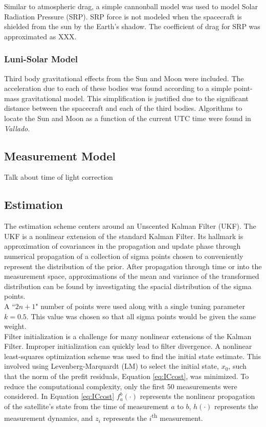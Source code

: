 \documentclass[11pt]{article}
\begin{document}
Similar to atmospheric drag, a simple cannonball model was used to model Solar Radiation Pressure (SRP). SRP force is not modeled when the spacecraft is shielded from the sun by the Earth's shadow. The coefficient of drag for SRP was approximated as XXX.

\subsubsection{Luni-Solar Model}

Third body gravitational effects from the Sun and Moon were included. The acceleration due to each of these bodies was found according to a simple point-mass gravitational model. This simplification is justified due to the significant distance between the spacecraft and each of the third bodies. Algorithms to locate the Sun and Moon as a function of the current UTC time were found in \textit{Vallado}.

\subsection{Measurement Model}

Talk about time of light correction

\subsection{Estimation}

The estimation scheme centers around an Unscented Kalman Filter (UKF). The UKF is a nonlinear extension of the standard Kalman Filter. Its hallmark is approximation of covariances in the propagation and update phase through numerical propagation of a collection of sigma points chosen to conveniently represent the distribution of the prior. After propagation through time or into the measurement space, approximations of the mean and variance of the transformed distribution can be found by investigating the spacial distribution of the sigma points. \\

A ``$2n+1$" number of points were used along with a single tuning parameter $k=0.5$. This value was chosen so that all sigma points would be given the same weight. \\

Filter initialization is a challenge for many nonlinear extensions of the Kalman Filter. Improper initialization can quickly lead to filter divergence. A nonlinear least-squares optimization scheme was used to find the initial state estimate. This involved using Levenberg-Marquardt (LM) to select the initial state, $x_0$, such that the norm of the prefit residuals, Equation \eqref{eq:ICcost}, was minimized. To reduce the computational complexity, only the first 50 measurements were considered. In Equation \eqref{eq:ICcost} $f_a^b(\cdot)$ represents the nonlinear propagation of the satellite's state from the time of measurement $a$ to $b$, $h(\cdot)$ represents the measurement dynamics, and $z_i$ represents the $i$\textsuperscript{th} measurement. 
\end{document}
